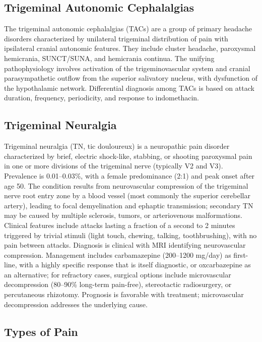 \subsection{Trigeminal Autonomic Cephalalgias}
\label{sec:Trigeminal Autonomic Cephalalgias}

The trigeminal autonomic cephalalgias (TACs) are a group of primary headache disorders characterized by unilateral trigeminal distribution of pain with ipsilateral cranial autonomic features. They include cluster headache, paroxysmal hemicrania, SUNCT/SUNA, and hemicrania continua. The unifying pathophysiology involves activation of the trigeminovascular system and cranial parasympathetic outflow from the superior salivatory nucleus, with dysfunction of the hypothalamic network. Differential diagnosis among TACs is based on attack duration, frequency, periodicity, and response to indomethacin.

\subsection{Trigeminal Neuralgia}
\label{sec:Trigeminal Neuralgia}
Trigeminal neuralgia (TN, tic douloureux) is a neuropathic pain disorder characterized by brief, electric shock-like, stabbing, or shooting paroxysmal pain in one or more divisions of the trigeminal nerve (typically V2 and V3). Prevalence is 0.01--0.03\%, with a female predominance (2:1) and peak onset after age 50. The condition results from neurovascular compression of the trigeminal nerve root entry zone by a blood vessel (most commonly the superior cerebellar artery), leading to focal demyelination and ephaptic transmission; secondary TN may be caused by multiple sclerosis, tumors, or arteriovenous malformations. Clinical features include attacks lasting a fraction of a second to 2 minutes triggered by trivial stimuli (light touch, chewing, talking, toothbrushing), with no pain between attacks. Diagnosis is clinical with MRI identifying neurovascular compression. Management includes carbamazepine (200--1200 mg/day) as first-line, with a highly specific response that is itself diagnostic, or oxcarbazepine as an alternative; for refractory cases, surgical options include microvascular decompression (80--90\% long-term pain-free), stereotactic radiosurgery, or percutaneous rhizotomy. Prognosis is favorable with treatment; microvascular decompression addresses the underlying cause.

\subsection{Types of Pain}
\label{sec:Types of Pain}

